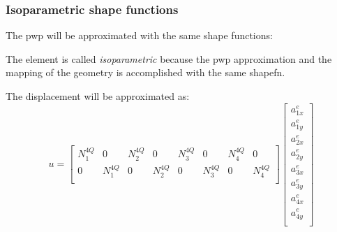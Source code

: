 \documentclass[notes]{beamer}
\begin{document}
\begin{frame}
\frametitle{Isoparametric shape functions}
The pwp will be approximated with the same shape functions:

The element is called \textit{isoparametric} because the pwp approximation and the mapping of the geometry is accomplished with the same shapefn.

The displacement will be approximated as:
\begin{equation*}
	u = \begin{bmatrix}
	N_1^{4Q} & 0 & N_2^{4Q} & 0 & N_3^{4Q} & 0 & N_4^{4Q} & 0 \\
	0 & N_1^{4Q} & 0 & N_2^{4Q} & 0 & N_3^{4Q} & 0 & N_4^{4Q} \\
	\end{bmatrix}
	\begin{bmatrix}
		a_{1x}^e \\
		a_{1y}^e \\
		a_{2x}^e \\
		a_{2y}^e \\
		a_{3x}^e \\
		a_{3y}^e \\
		a_{4x}^e \\
		a_{4y}^e \\
	\end{bmatrix}
\end{equation*}
\end{frame}
\end{document}
